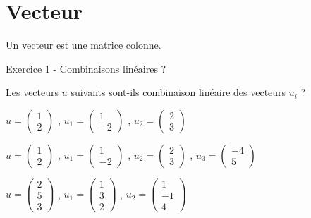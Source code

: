 \newpage
\section{Vecteur}
%
Un vecteur est une matrice colonne.

\vspace{.323cm}
Exercice 1 - Combinaisons linéaires ?

\vspace{.323cm}
Les vecteurs $u$ suivants sont-ils combinaison linéaire des vecteurs $u_i$ ?

\vspace{.323cm}
$ u = 
\left( \begin{array}{ c }
 1 \\ 2
\end{array} \right)$
,
$ u_1 = 
\left( \begin{array}{ c }
 1 \\ −2
\end{array} \right)$
,
$ u_2 = 
\left( \begin{array}{ c }
 2 \\ 3
\end{array} \right)$

\vspace{.323cm}
$ u = 
\left( \begin{array}{ c }
 1 \\ 2
\end{array} \right)$
,
$ u_1 = 
\left( \begin{array}{ c }
 1 \\ −2
\end{array} \right)$
,
$ u_2 = 
\left( \begin{array}{ c }
 2 \\ 3
\end{array} \right)$
,
$ u_3 = 
\left( \begin{array}{ c }
 −4 \\ 5
\end{array} \right)$

\vspace{.323cm}
$ u = 
\left( \begin{array}{ c }
 2 \\ 5 \\ 3
\end{array} \right)$
,
$ u_1 = 
\left( \begin{array}{ c }
 1 \\ 3 \\ 2
\end{array} \right)$
,
$ u_2 = 
\left( \begin{array}{ c }
 1 \\ −1 \\ 4
\end{array} \right)$

